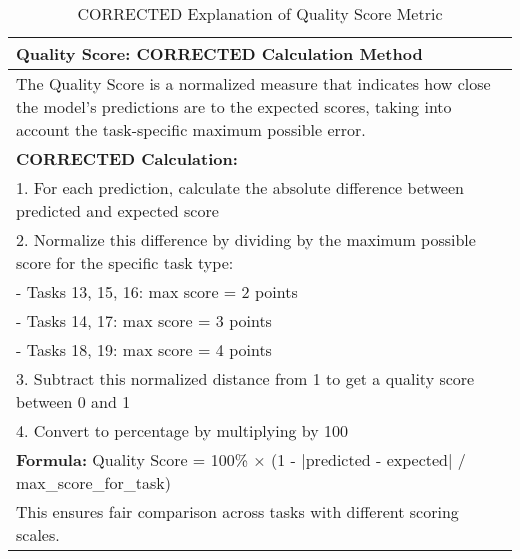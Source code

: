 \documentclass{article}
\begin{document}
\begin{table}[htbp]
\centering
\caption{CORRECTED Explanation of Quality Score Metric}
\label{tab:quality_score_explanation}
\begin{tabular}{p{12cm}}
\toprule
\textbf{Quality Score: CORRECTED Calculation Method} \\
\midrule
The Quality Score is a normalized measure that indicates how close the model's predictions are to the expected scores, taking into account the task-specific maximum possible error. \\
\addlinespace
\textbf{CORRECTED Calculation:} \\
1. For each prediction, calculate the absolute difference between predicted and expected score \\
2. Normalize this difference by dividing by the maximum possible score for the specific task type: \\
   - Tasks 13, 15, 16: max score = 2 points \\
   - Tasks 14, 17: max score = 3 points \\
   - Tasks 18, 19: max score = 4 points \\
3. Subtract this normalized distance from 1 to get a quality score between 0 and 1 \\
4. Convert to percentage by multiplying by 100 \\
\addlinespace
\textbf{Formula:} Quality Score = 100\% × (1 - |predicted - expected| / max\_score\_for\_task) \\
\addlinespace
This ensures fair comparison across tasks with different scoring scales. \\
\bottomrule
\end{tabular}
\end{table}
\end{document}
